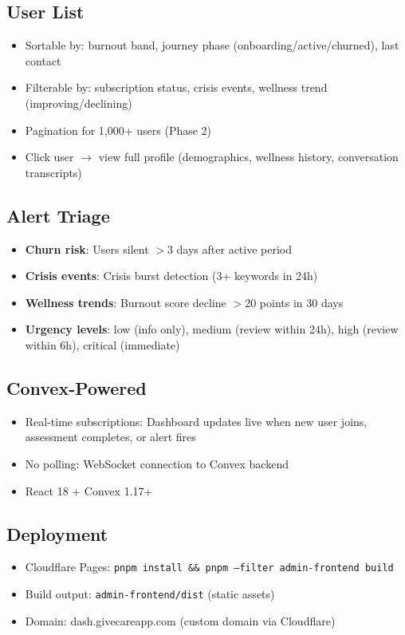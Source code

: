 \documentclass{article}
\begin{document}
\subsection*{User List}
\begin{itemize}
    \item Sortable by: burnout band, journey phase (onboarding/active/churned), last contact
    \item Filterable by: subscription status, crisis events, wellness trend (improving/declining)
    \item Pagination for 1,000+ users (Phase 2)
    \item Click user $\rightarrow$ view full profile (demographics, wellness history, conversation transcripts)
\end{itemize}

\subsection*{Alert Triage}
\begin{itemize}
    \item \textbf{Churn risk}: Users silent $>$3 days after active period
    \item \textbf{Crisis events}: Crisis burst detection (3+ keywords in 24h)
    \item \textbf{Wellness trends}: Burnout score decline $>$20 points in 30 days
    \item \textbf{Urgency levels}: low (info only), medium (review within 24h), high (review within 6h), critical (immediate)
\end{itemize}

\subsection*{Convex-Powered}
\begin{itemize}
    \item Real-time subscriptions: Dashboard updates live when new user joins, assessment completes, or alert fires
    \item No polling: WebSocket connection to Convex backend
    \item React 18 + Convex 1.17+
\end{itemize}

\subsection*{Deployment}
\begin{itemize}
    \item Cloudflare Pages: \texttt{pnpm install \&\& pnpm --filter admin-frontend build}
    \item Build output: \texttt{admin-frontend/dist} (static assets)
    \item Domain: dash.givecareapp.com (custom domain via Cloudflare)
\end{itemize}
\end{document}

